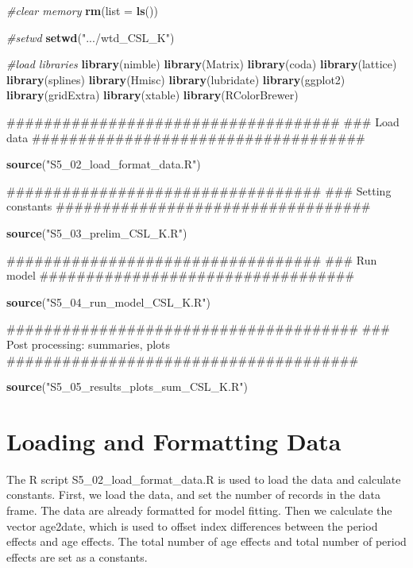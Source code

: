 \documentclass[11pt,]{article}
\newenvironment{Shaded}{\begin{snugshade}}{\end{snugshade}}
\newcommand{\KeywordTok}[1]{\textcolor[rgb]{0.13,0.29,0.53}{\textbf{#1}}}
\newcommand{\DataTypeTok}[1]{\textcolor[rgb]{0.13,0.29,0.53}{#1}}
\newcommand{\StringTok}[1]{\textcolor[rgb]{0.31,0.60,0.02}{#1}}
\newcommand{\CommentTok}[1]{\textcolor[rgb]{0.56,0.35,0.01}{\textit{#1}}}
\newcommand{\NormalTok}[1]{#1}
\begin{document}
\begin{Shaded}
\begin{Highlighting}[]
\CommentTok{#clear memory}
\KeywordTok{rm}\NormalTok{(}\DataTypeTok{list =} \KeywordTok{ls}\NormalTok{())}

\CommentTok{#setwd}
\KeywordTok{setwd}\NormalTok{(}\StringTok{".../wtd_CSL_K"}\NormalTok{)}

\CommentTok{#load libraries}
\KeywordTok{library}\NormalTok{(nimble)}
\KeywordTok{library}\NormalTok{(Matrix)}
\KeywordTok{library}\NormalTok{(coda)}
\KeywordTok{library}\NormalTok{(lattice)}
\KeywordTok{library}\NormalTok{(splines)}
\KeywordTok{library}\NormalTok{(Hmisc)}
\KeywordTok{library}\NormalTok{(lubridate)}
\KeywordTok{library}\NormalTok{(ggplot2)}
\KeywordTok{library}\NormalTok{(gridExtra)}
\KeywordTok{library}\NormalTok{(xtable)}
\KeywordTok{library}\NormalTok{(RColorBrewer)}

\NormalTok{####################################}
\NormalTok{### Load data}
\NormalTok{####################################}

\KeywordTok{source}\NormalTok{(}\StringTok{"S5_02_load_format_data.R"}\NormalTok{)}

\NormalTok{##################################}
\NormalTok{### Setting constants}
\NormalTok{##################################}

\KeywordTok{source}\NormalTok{(}\StringTok{"S5_03_prelim_CSL_K.R"}\NormalTok{)}

\NormalTok{##################################}
\NormalTok{### Run model}
\NormalTok{##################################}

\KeywordTok{source}\NormalTok{(}\StringTok{"S5_04_run_model_CSL_K.R"}\NormalTok{)}

\NormalTok{######################################}
\NormalTok{### Post processing: summaries, plots}
\NormalTok{######################################}

\KeywordTok{source}\NormalTok{(}\StringTok{"S5_05_results_plots_sum_CSL_K.R"}\NormalTok{)}
\end{Highlighting}
\end{Shaded}

\section{Loading and Formatting Data}\label{loading-and-formatting-data}

The R script S5\_02\_load\_format\_data.R is used to load the data and
calculate constants. First, we load the data, and set the number of
records in the data frame. The data are already formatted for model
fitting. Then we calculate the vector age2date, which is used to offset
index differences between the period effects and age effects. The total
number of age effects and total number of period effects are set as a
constants.
\end{document}
